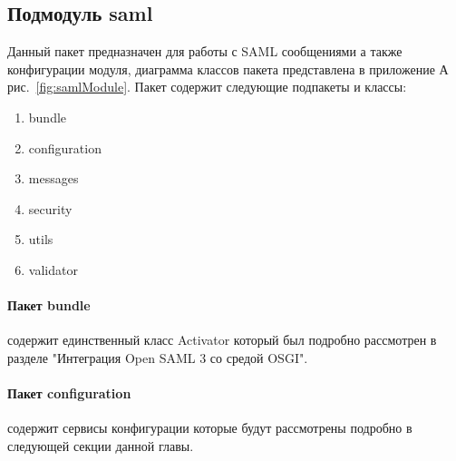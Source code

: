 \subsection{Подмодуль saml} 
Данный пакет предназначен для работы с SAML сообщениями а также конфигурации модуля, диаграмма классов пакета представлена в приложение А рис.~\ref{fig:samlModule}. Пакет содержит следующие подпакеты и классы:
\begin{enumerate}
\item bundle
\item configuration
\item messages
\item security
\item utils
\item validator
\end{enumerate}

\paragraph{Пакет bundle} содержит единственный класс Activator который был подробно рассмотрен в разделе "Интеграция Open SAML 3 со средой OSGI".
\paragraph{Пакет configuration} содержит сервисы конфигурации которые будут рассмотрены подробно в следующей секции данной главы.
